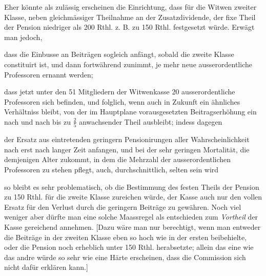 
Eher könnte als zulässig erscheinen die Einrichtung, dass für die Witwen zweiter Klasse, neben gleichmässiger Theilnahme an der Zusatzdividende, der fixe Theil der Pension niedriger als 200 Rthl. z. B. zu 150 Rthl. festgesetzt würde. Erwägt man jedoch,

dass die Einbusse an Beiträgen sogleich anfängt, sobald die zweite Klasse constituirt ist, und dann fortwährend zunimmt, je mehr neue ausserordentliche Professoren ernannt werden;

dass jetzt unter den 51 Mitgliedern der Witwenkasse 20 ausserordentliche Professoren sich befinden, und folglich, wenn auch in Zukunft ein ähnliches Verhältniss bleibt, von der im Hauptplane vorausgesetzten Beitragserhöhung ein nach und nach bis zu \(\tfrac{2}{5}\) anwachsender Theil ausbleibt; indess dagegen

der Ersatz aus eintretenden geringern Pensionirungen aller Wahrscheinlichkeit nach erst nach langer Zeit anfangen, und bei der sehr geringen Mortalität, die demjenigen Alter zukommt, in dem die Mehrzahl der ausserordentlichen Professoren zu stehen pflegt, auch, durchschnittlich, selten sein wird

so bleibt es sehr problematisch, ob die Bestimmung des festen Theils der Pension zu 150 Rthl. für die zweite Klasse zureichen würde, der Kasse auch nur den vollen Ersatz für den Verlust durch die geringern Beiträge zu gewähren. Noch viel weniger aber dürfte man eine solche Maassregel als entschieden zum \textit{Vortheil} der Kasse gereichend annehmen. [Dazu wäre man nur berechtigt, wenn man entweder die Beiträge in der zweiten Klasse eben so hoch wie in der ersten beibehielte, oder die Pension noch erheblich unter 150 Rthl. herabsetzte; allein das eine wie das andre würde so sehr wie eine Härte erscheinen, dass die Commission sich nicht dafür erklären kann.]

